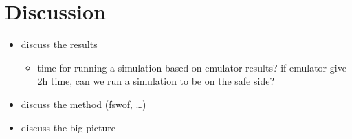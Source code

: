 \chapter{Discussion}
\label{chp:conclusions}

\begin{itemize}
\itemsep0em
  \item discuss the results
  \begin{itemize}
  \itemsep0em
    \item time for running a simulation based on emulator results? if emulator give 2h time, can we run a simulation to be on the safe side?
  \end{itemize}
  \item discuss the method (fswof, \dots)
  \item discuss the big picture
\end{itemize}
